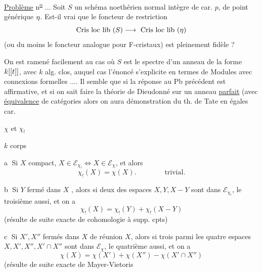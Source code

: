 \uline{Problème} n\textsuperscript{\uline{o}} ... Soit $S$ un schéma noethérien normal  intègre de car.
$p$, de point générique $\eta$. Est-il vrai que le foncteur de restriction
\[
\text{Cris loc lib }(S)\longrightarrow\text{ Cris loc lib }(\eta)
\]
(ou du moins le foncteur analogue pour F-cristaux) est pleinement fidèle ?

On est ramené facilement au cas où $S$ est le spectre d'un anneau de
la forme $k[[t]]$, avec $k$ alg. clos, auquel cas l'énoncé s'explicite en
termes de Modules avec connexions formelles .... Il semble que si la réponse au Pb précédent est affirmative,  et si on sait faire la
théorie de Dieudonné sur un anneau \uline{parfait} (avec \uline{équivalence} de catégories
alors on aura démonstration du th. de Tate en égales car.

$\chi$ et $\chi_!$

$k$ corps

\textcircled{a}  Si $X$ compact, $X\in\mathcal E_{\chi_!}\Longleftrightarrow X\in\mathcal E_{\chi}$, et alors
\[
\chi_!(X)=\chi(X).\qquad\qquad\text{trivial.}
\]

\textcircled{b} Si $Y$ fermé dans $X$ , alors si deux des espaces $X,Y,X-Y$
sont dans $\mathcal E_{\chi_!}$, le troisième aussi, et on a
\[
\chi_!(X)=\chi_!(Y)+\chi_!(X-Y)
\]
(résulte de suite exacte de cohomologie à supp. cpts)

\textcircled{c} Si $X',X''$  fermés dans $X$ de réunion $X$, alors si trois
parmi les quatre espaces $X,X',X'',X'\cap X''$ sont dans
$\mathcal E_{\chi}$, le quatrième aussi, et on a
\[
\chi(X)=\chi(X')+\chi(X'')-\chi(X'\cap X'')
\]
(résulte de suite exacte de Mayer-Vietoris


